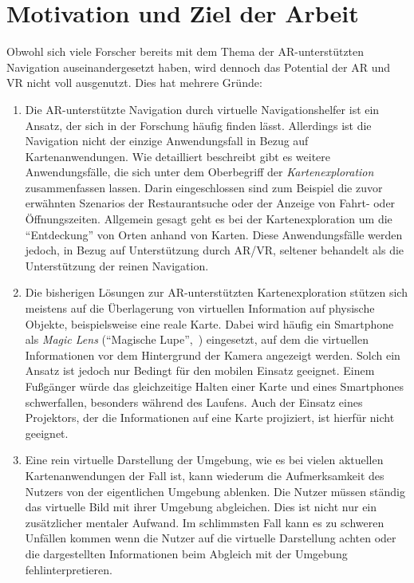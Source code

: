 \section{Motivation und Ziel der Arbeit}
\label{sec:motivation_ziel}
Obwohl sich viele Forscher bereits mit dem Thema der AR-unterstützten Navigation auseinandergesetzt haben, wird dennoch das Potential der AR und VR nicht voll ausgenutzt.
Dies hat mehrere Gründe:
\begin{enumerate}
\item Die AR-unterstützte Navigation durch virtuelle Navigationshelfer ist ein Ansatz, der sich in der Forschung häufig finden lässt.
Allerdings ist die Navigation nicht der einzige Anwendungsfall in Bezug auf Kartenanwendungen.
Wie \textcite{Reichenbacher2001} detailliert beschreibt gibt es weitere Anwendungsfälle, die sich unter dem Oberbegriff der \emph{Kartenexploration} zusammenfassen lassen.
Darin eingeschlossen sind zum Beispiel die zuvor erwähnten Szenarios der Restaurantsuche oder der Anzeige von Fahrt- oder Öffnungszeiten.
Allgemein gesagt geht es bei der Kartenexploration um die \enquote{Entdeckung} von Orten anhand von Karten.
Diese Anwendungsfälle werden jedoch, in Bezug auf Unterstützung durch AR/VR, seltener behandelt als die Unterstützung der reinen Navigation.

\item Die bisherigen Lösungen zur AR-unterstützten Kartenexploration stützen sich meistens auf die Überlagerung von virtuellen Information auf physische Objekte, beispielsweise eine reale Karte.
Dabei wird häufig ein Smartphone als \emph{Magic Lens} (\enquote{Magische Lupe},~\cite{Bier1994}) eingesetzt, auf dem die virtuellen Informationen vor dem Hintergrund der Kamera angezeigt werden.
Solch ein Ansatz ist jedoch nur Bedingt für den mobilen Einsatz geeignet.
Einem Fußgänger würde das gleichzeitige Halten einer Karte und eines Smartphones schwerfallen, besonders während des Laufens.
Auch der Einsatz eines Projektors, der die Informationen auf eine Karte projiziert, ist hierfür nicht geeignet.

\item Eine rein virtuelle Darstellung der Umgebung, wie es bei vielen aktuellen Kartenanwendungen der Fall ist, kann wiederum die Aufmerksamkeit des Nutzers von der eigentlichen Umgebung ablenken.
Die Nutzer müssen ständig das virtuelle Bild mit ihrer Umgebung abgleichen.
Dies ist nicht nur ein zusätzlicher mentaler Aufwand.
Im schlimmsten Fall kann es zu schweren Unfällen kommen wenn die Nutzer auf die virtuelle Darstellung achten oder die dargestellten Informationen beim Abgleich mit der Umgebung fehlinterpretieren.


\end{enumerate}
